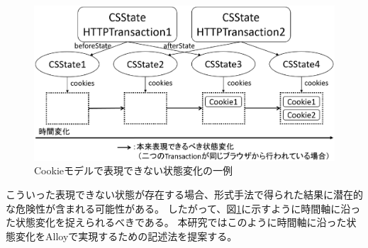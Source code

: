 \documentclass[12pt,a4paper]{jbook}
\begin{document}
\begin{figure}[htb]
\centering
\includegraphics[width=450pt]{./fig/2transaction-b.eps}
\caption{Cookieモデルで表現できない状態変化の一例}
\label{fig:2transaction-b}
\end{figure}
こういった表現できない状態が存在する場合、形式手法で得られた結果に潜在的な危険性が含まれる可能性がある。
したがって、図\ref{fig:2transaction-b}に示すように時間軸に沿った状態変化を捉えられるべきである。
本研究ではこのように時間軸に沿った状態変化をAlloyで実現するための記述法を提案する。
\end{document}
